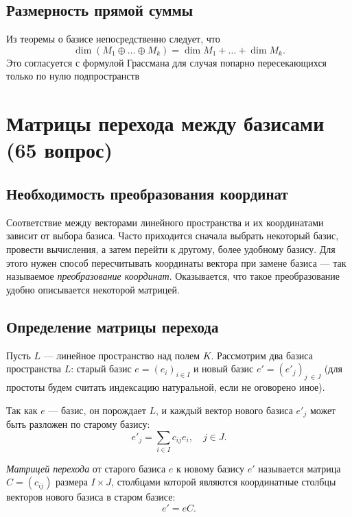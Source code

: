 \documentclass[a4paper,12pt]{article}
\theoremstyle{definition}
\theoremstyle{plain}
\theoremstyle{remark}
\begin{document}
	\subsection{Размерность прямой суммы}
	
	Из теоремы о базисе непосредственно следует, что
	\[
	\dim (M_1 \oplus \dots \oplus M_k) = \dim M_1 + \dots + \dim M_k.
	\]
	Это согласуется с формулой Грассмана для случая попарно пересекающихся только по нулю подпространств
	
	
	
	
	\newpage
	\section{Матрицы перехода между базисами (65 вопрос)}
	
	\subsection{Необходимость преобразования координат}
	
	Соответствие между векторами линейного пространства и их координатами зависит от выбора базиса. Часто приходится сначала выбрать некоторый базис, провести вычисления, а затем перейти к другому, более удобному базису. Для этого нужен способ пересчитывать координаты вектора при замене базиса — так называемое \textit{преобразование координат}. Оказывается, что такое преобразование удобно описывается некоторой матрицей.
	
	\subsection{Определение матрицы перехода}
	
	Пусть \( L \) — линейное пространство над полем \( K \). Рассмотрим два базиса пространства \( L \): старый базис \( e = (e_i)_{i \in I} \) и новый базис \( e' = (e'_j)_{j \ \in J} \) (для простоты будем считать индексацию натуральной, если не оговорено иное).
	
	Так как \( e \) — базис, он порождает \( L \), и каждый вектор нового базиса \( e'_j \) может быть разложен по старому базису:
	\[
	e'_j = \sum_{i \in I} c_{ij} e_i, \quad j \in J.
	\]
	
	\begin{tcolorbox}[colback=blue!5, colframe=blue!40!black, title=Определение]
		\textit{Матрицей перехода} от старого базиса \( e \) к новому базису \( e' \) называется матрица \( C = (c_{ij}) \) размера \( I \times J \), столбцами которой являются координатные столбцы векторов нового базиса в старом базисе:
		\[
		e' = e C.
		\]
	\end{tcolorbox}
	
\end{document}
